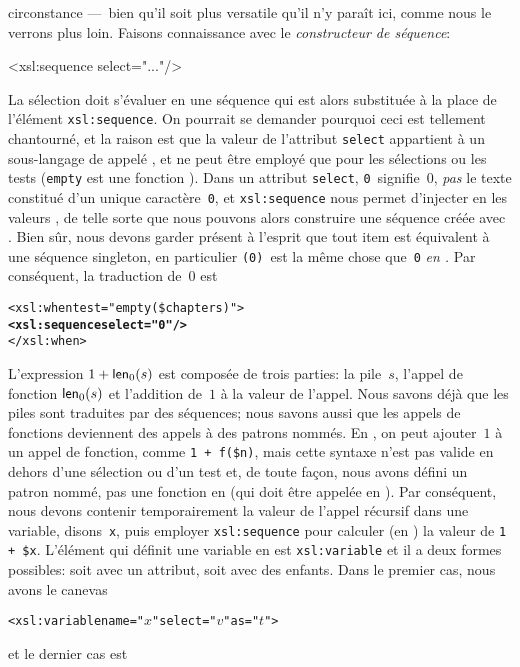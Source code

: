 circonstance ---~bien qu'il soit plus versatile qu'il n'y paraît ici,
comme nous le verrons plus loin. Faisons connaissance avec le
\emph{constructeur de séquence}:
\begin{sverb}
<xsl:sequence select="..."/>
\end{sverb}
La sélection doit s'évaluer en une séquence qui est alors substituée à
la place de l'élément \texttt{xsl:sequence}. On pourrait se demander
pourquoi ceci est tellement chantourné, et la raison est que la valeur
de l'attribut \texttt{select} appartient à un sous-langage de \XSLT
appelé \XPath, et \XPath ne peut être employé que pour les sélections
ou les tests (\texttt{empty} est une fonction \XPath). Dans un
attribut \texttt{select}, \texttt{0}~signifie~\(0\), \emph{pas} le
texte constitué d'un unique caractère~\texttt{0}, et
\texttt{xsl:sequence} nous permet d'injecter en \XSLT les valeurs
\XPath, de telle sorte que nous pouvons alors construire une séquence
créée avec \XPath. Bien sûr, nous devons garder présent à l'esprit que
tout item est équivalent à une séquence singleton, en particulier
\texttt{(0)}~est la même chose que~\texttt{0} \emph{en \XPath.} Par
conséquent, la traduction de~\(0\) est
\begin{alltt}
\small      <xsl:when test="empty(\$chapters)">
        \textbf{<xsl:sequence select="0"/>}
      </xsl:when>
\end{alltt}
L'expression \(1 + \textsf{len}_0(s)\) est composée de trois parties: la
pile~\(s\), l'appel de fonction \(\textsf{len}_0(s)\) et l'addition
de~\(1\) à la valeur de l'appel. Nous savons déjà que les piles sont
traduites par des séquences; nous savons aussi que les appels de
fonctions deviennent des appels à des patrons nommés. En \XPath, on
peut ajouter~\(1\) à un appel de fonction, comme \texttt{1 + f(\$n)},
mais cette syntaxe n'est pas valide en dehors d'une sélection ou d'un
test et, de toute façon, nous avons défini un patron nommé, pas une
fonction en \XSLT (qui doit être appelée en \XPath). Par conséquent,
nous devons contenir temporairement la valeur de l'appel récursif dans
une variable, disons~\texttt{x}, puis employer \texttt{xsl:sequence}
pour calculer (en \XPath) la valeur de \texttt{1 + \$x}. L'élément qui
définit une variable en \XSLT est \texttt{xsl:variable} et il a deux
formes possibles: soit avec un attribut, soit avec des enfants. Dans
le premier cas, nous avons le canevas
\begin{alltt}
\small<xsl:variable name="\(x\)" select="\(v\)" as="\(t\)">
\end{alltt}
et le dernier cas est

